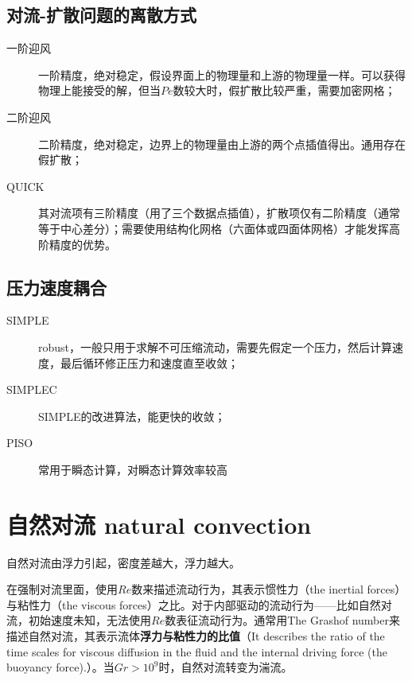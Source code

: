 \subsection{对流-扩散问题的离散方式}

\begin{description}
    \item[一阶迎风] 一阶精度，绝对稳定，假设界面上的物理量和上游的物理量一样。可以获得物理上能接受的解，但当$ Pe $数较大时，假扩散比较严重，需要加密网格；
    \item[二阶迎风] 二阶精度，绝对稳定，边界上的物理量由上游的两个点插值得出。通用存在假扩散；
    \item[QUICK] 其对流项有三阶精度（用了三个数据点插值），扩散项仅有二阶精度（通常等于中心差分）；需要使用结构化网格（六面体或四面体网格）才能发挥高阶精度的优势。
\end{description}

\subsection{压力速度耦合}

\begin{description}
    \item[SIMPLE] robust，一般只用于求解不可压缩流动，需要先假定一个压力，然后计算速度，最后循环修正压力和速度直至收敛；
    \item[SIMPLEC] SIMPLE的改进算法，能更快的收敛；
    \item[PISO] 常用于瞬态计算，对瞬态计算效率较高
\end{description}

\section{自然对流 natural convection}

自然对流由浮力引起，密度差越大，浮力越大。

在强制对流里面，使用$Re$数来描述流动行为，其表示惯性力（the inertial
forces）与粘性力（the viscous forces）之比。对于内部驱动的流动行为——比如自然对流，初始速度未知，无法使用$Re$数表征流动行为。通常用The Grashof number来描述自然对流，其表示流体\textbf{浮力与粘性力的比值}（It describes the ratio of the time scales for viscous diffusion in the fluid and the internal driving force (the buoyancy force).）。当$Gr>10^9$时，自然对流转变为湍流。

%

